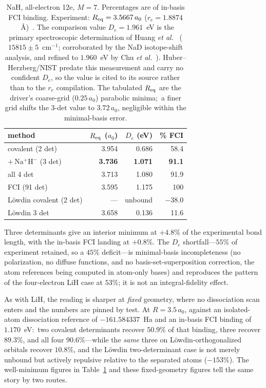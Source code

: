 \documentclass[aps,pra,twocolumn,superscriptaddress,longbibliography]{revtex4-2}
\begin{document}
\begin{table}[b]
\caption{NaH, all-electron 12e, $M = 7$.  Percentages are of in-basis FCI
binding.  Experiment: $R_{\rm eq} = 3.5667\,a_0$
($r_e = 1.8874$~\AA)~\cite{huberherzberg}.  The comparison value
$D_e = 1.961$~eV is the primary spectroscopic determination of Huang
\emph{et al.}~\cite{huang2010} ($15815\pm5$~cm$^{-1}$; corroborated by the
NaD isotope-shift analysis, and refined to $1.960$~eV by Chu \emph{et
al.}~\cite{chu2018}).  Huber--Herzberg/NIST predate this measurement and
carry no confident $D_e$, so the value is cited to its source rather than to
the $r_e$ compilation.  The tabulated $R_{\rm eq}$ are the driver's
coarse-grid ($0.25\,a_0$) parabolic minima;\ a finer grid shifts the 3-det
value to $3.72\,a_0$, negligible within the minimal-basis error.}
\label{tab:nah}
\begin{ruledtabular}
\begin{tabular}{lrrr}
method & $R_{\rm eq}$ ($a_0$) & $D_e$ (eV) & \% FCI \\
\hline
covalent (2 det) & 3.954 & 0.686 & 58.4 \\
$+\,\mathrm{Na^+H^-}$ (3 det) & \textbf{3.736} & \textbf{1.071} & \textbf{91.1} \\
all 4 det & 3.713 & 1.080 & 91.9 \\
FCI (91 det) & 3.595 & 1.175 & 100 \\
\hline
L\"owdin covalent (2 det) & --- & unbound & $-38.0$ \\
L\"owdin 3 det & 3.658 & 0.136 & 11.6 \\
\end{tabular}
\end{ruledtabular}
\end{table}

Three determinants give an interior minimum at $+4.8\%$ of the
experimental bond length, with the in-basis FCI landing at $+0.8\%$.  The
$D_e$ shortfall---$55\%$ of experiment retained, so a $45\%$ deficit---is
minimal-basis incompleteness (no polarization, no diffuse functions, and no
basis-set-superposition correction, the atom references being computed in
atom-only bases) and reproduces the pattern of the four-electron LiH case at
$53\%$; it is not an integral-fidelity effect.

As with LiH, the reading is sharper at \emph{fixed} geometry, where no
dissociation scan enters and the numbers are pinned by test.  At
$R = 3.5\,a_0$, against an isolated-atom dissociation reference of
$-161.584337$~Ha and an in-basis FCI binding of $1.170$~eV:\ two covalent
determinants recover $50.9\%$ of that binding, three recover $89.3\%$, and
all four $90.6\%$---while the \emph{same} three on L\"owdin-orthogonalized
orbitals recover $10.8\%$, and the L\"owdin two-determinant case is not
merely unbound but actively repulsive relative to the separated atoms
($-153\%$).  The well-minimum figures in Table~\ref{tab:nah} and these
fixed-geometry figures tell the same story by two routes.
\end{document}
